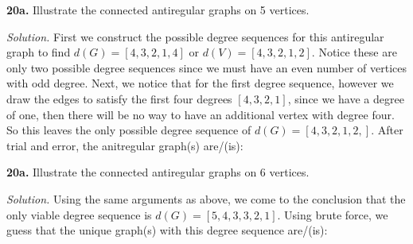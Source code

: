 \documentclass{article}
\begin{document}
\textbf{20a.} Illustrate the connected antiregular graphs on 5 vertices. 

\vspace{3mm}  

\textit{Solution.} First we construct the possible degree sequences for this antiregular graph to find \(d(G) =[4,3,2,1,4] \) or \( d(V) = [4,3,2,1,2] \). Notice these are only two possible degree sequences since we must have an even number of vertices with odd degree. Next, we notice that for the first degree sequence, however we draw the edges to satisfy the first four degrees \([4,3,2,1]\), since we have a degree of one, then there will be no way to have an additional vertex with degree four. So this leaves the only possible degree sequence of \(d(G) = [4,3,2,1,2,]\). After trial and error, the anitregular graph(s) are/(is): 
\begin{center}
 \hspace{1in}
\end{center}


\newpage

\textbf{20a.} Illustrate the connected antiregular graphs on 6 vertices. 

\vspace{3mm}  

\textit{Solution.} Using the same arguments as above, we come to the conclusion that the only viable degree sequence is \(d(G)=[5,4,3,3,2,1]\). Using brute force, we guess that the unique graph(s) with this degree sequence are/(is): 
\end{document}
